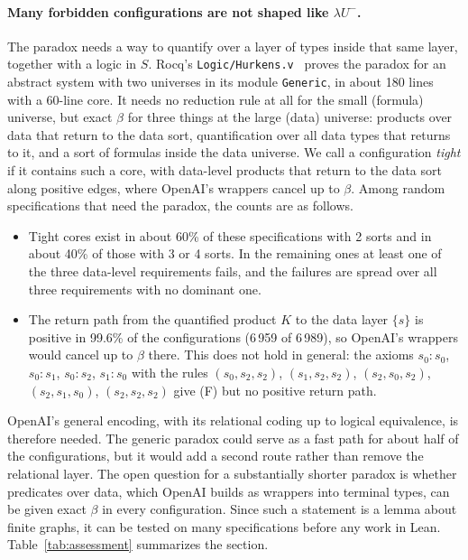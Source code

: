 \documentclass[10pt]{article}
\begin{document}
\paragraph{Many forbidden configurations are not shaped like $\lambda U^-$.} The
paradox needs a way to quantify over a layer of types inside that same layer,
together with a logic in $S$. Rocq's \texttt{Logic/Hurkens.v}~\cite{RocqHurkens}
proves the paradox for an abstract system with two universes in its module
\texttt{Generic}, in about 180 lines with a 60-line core. It needs no reduction rule
at all for the small (formula) universe, but exact $\beta$ for three things at the
large (data) universe: products over data that return to the data sort,
quantification over all data types that returns to it, and a sort of formulas inside
the data universe. We call a configuration \emph{tight} if it contains such a core,
with data-level products that return to the data sort along positive edges, where
OpenAI's wrappers cancel up to $\beta$. Among random specifications that need the
paradox, the counts are as follows.
\begin{itemize}
\item Tight cores exist in about 60\% of these specifications with 2 sorts and in
  about 40\% of those with 3 or 4 sorts. In the remaining ones at least one of the
  three data-level requirements fails, and the failures are spread over all three
  requirements with no dominant one.
\item The return path from the quantified product $K$ to the data layer $\{s\}$ is
  positive in 99.6\% of the configurations (6\,959 of 6\,989), so OpenAI's wrappers
  would cancel up to $\beta$ there. This does not hold in general: the axioms
  $s_0{:}s_0$, $s_0{:}s_1$, $s_0{:}s_2$, $s_1{:}s_0$ with the rules $(s_0,s_2,s_2)$,
  $(s_1,s_2,s_2)$, $(s_2,s_0,s_2)$, $(s_2,s_1,s_0)$, $(s_2,s_2,s_2)$ give (F) but no
  positive return path.
\end{itemize}
OpenAI's general encoding, with its relational coding up to logical equivalence, is
therefore needed. The generic paradox could serve as a fast path for about half of
the configurations, but it would add a second route rather than remove the
relational layer. The open question for a substantially shorter paradox is whether
predicates over data, which OpenAI builds as wrappers into terminal types, can be
given exact $\beta$ in every configuration. Since such a statement is a lemma about
finite graphs, it can be tested on many specifications before any work in Lean.
Table~\ref{tab:assessment} summarizes the section.
\end{document}

